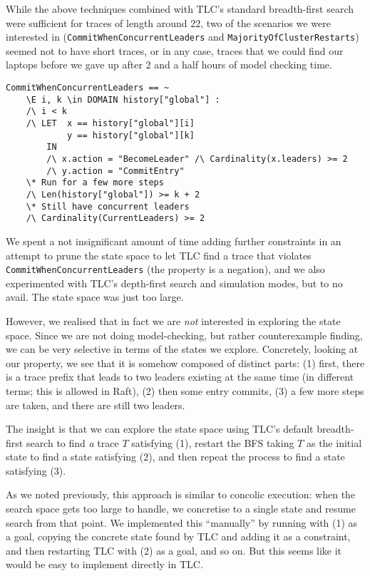\documentclass[a4paper]{article}
\begin{document}
While the above techniques combined with TLC's standard breadth-first search were sufficient for traces of length around 22, two of the scenarios we were interested in (\texttt{CommitWhenConcurrentLeaders} and \texttt{MajorityOfClusterRestarts}) seemed not to have short traces, or in any case, traces that we could find our laptops before we gave up after 2 and a half hours of model checking time.

\begin{verbatim}
CommitWhenConcurrentLeaders == ~
    \E i, k \in DOMAIN history["global"] :
    /\ i < k
    /\ LET  x == history["global"][i]
            y == history["global"][k]
        IN
        /\ x.action = "BecomeLeader" /\ Cardinality(x.leaders) >= 2
        /\ y.action = "CommitEntry"
    \* Run for a few more steps
    /\ Len(history["global"]) >= k + 2
    \* Still have concurrent leaders
    /\ Cardinality(CurrentLeaders) >= 2
\end{verbatim}

We spent a not insignificant amount of time adding further constraints in an attempt to prune
the state space to let TLC find a trace that violates \texttt{CommitWhenConcurrentLeaders} (the property is a negation), and we also experimented with TLC's depth-first search and simulation modes, but to no avail.
%
The state space was just too large.

However, we realised that in fact we are \emph{not} interested in exploring the state space. 
%
Since we are not doing model-checking, but rather counterexample finding, we can be very selective in terms of the states we explore.
%
Concretely, looking at our property, we see that it is somehow composed of distinct parts:
%
(1) first, there is a trace prefix that leads to two leaders existing at the same time (in different terms; this is allowed in Raft),
%
(2) then some entry commits,
%
(3) a few more steps are taken, and there are still two leaders.

The insight is that we can explore the state space using TLC's default breadth-first search to find \emph{a} trace $T$ satisfying (1), restart the BFS taking $T$ as the initial state to find a state satisfying (2), and then repeat the process to find a state satisfying (3).

As we noted previously, this approach is similar to concolic execution:
%
when the search space gets too large to handle, we concretise to a single state and resume search from that point.
%
We implemented this ``manually'' by running with (1) as a goal, copying the concrete state found by TLC and adding it as a constraint, and then restarting TLC with (2) as a goal, and so on.
%
But this seems like it would be easy to implement directly in TLC.
\end{document}
